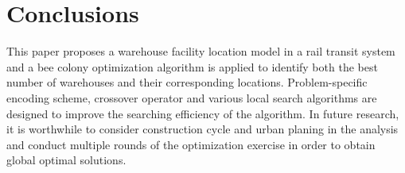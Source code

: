 \section{Conclusions}
This paper proposes a warehouse facility location model in a rail transit system and a bee colony optimization algorithm is applied to identify both the best number of warehouses and their corresponding locations.
Problem-specific encoding scheme, crossover operator and various local search algorithms are designed to improve the searching efficiency of the algorithm.
In future research, it is worthwhile to consider construction cycle and urban planing in the analysis and conduct multiple rounds of the optimization exercise in order to obtain global optimal solutions.
